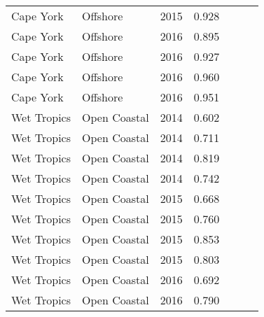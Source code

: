 {\begin{longtable}{llccccc}
  Cape York & Offshore & 2015 & 0.928 & \cellcolor[HTML]{00734D}{A} & \cellcolor[HTML]{00734D}{A} & \cellcolor[HTML]{00734D}{A} \\ 
  Cape York & Offshore & 2016 & 0.895 & \cellcolor[HTML]{00734D}{A} & \cellcolor[HTML]{00734D}{A} & \cellcolor[HTML]{00734D}{A} \\ 
  Cape York & Offshore & 2016 & 0.927 & \cellcolor[HTML]{00734D}{A} & \cellcolor[HTML]{00734D}{A} & \cellcolor[HTML]{00734D}{A} \\ 
  Cape York & Offshore & 2016 & 0.960 & \cellcolor[HTML]{00734D}{A} & \cellcolor[HTML]{00734D}{A} & \cellcolor[HTML]{00734D}{A} \\ 
  Cape York & Offshore & 2016 & 0.951 & \cellcolor[HTML]{00734D}{A} & \cellcolor[HTML]{00734D}{A} & \cellcolor[HTML]{00734D}{A} \\ 
  Wet Tropics & Open Coastal & 2014 & 0.602 & \cellcolor[HTML]{F0C918}{C} & \cellcolor[HTML]{B0D235}{B} & \cellcolor[HTML]{F0C918}{C} \\ 
  Wet Tropics & Open Coastal & 2014 & 0.711 & \cellcolor[HTML]{B0D235}{B} & \cellcolor[HTML]{B0D235}{B} & \cellcolor[HTML]{B0D235}{B} \\ 
  Wet Tropics & Open Coastal & 2014 & 0.819 & \cellcolor[HTML]{B0D235}{B} & \cellcolor[HTML]{00734D}{A} & \cellcolor[HTML]{B0D235}{B} \\ 
  Wet Tropics & Open Coastal & 2014 & 0.742 & \cellcolor[HTML]{B0D235}{B} & \cellcolor[HTML]{B0D235}{B} & \cellcolor[HTML]{B0D235}{B} \\ 
  Wet Tropics & Open Coastal & 2015 & 0.668 & \cellcolor[HTML]{B0D235}{B} & \cellcolor[HTML]{B0D235}{B} & \cellcolor[HTML]{B0D235}{B} \\ 
  Wet Tropics & Open Coastal & 2015 & 0.760 & \cellcolor[HTML]{B0D235}{B} & \cellcolor[HTML]{B0D235}{B} & \cellcolor[HTML]{B0D235}{B} \\ 
  Wet Tropics & Open Coastal & 2015 & 0.853 & \cellcolor[HTML]{00734D}{A} & \cellcolor[HTML]{00734D}{A} & \cellcolor[HTML]{00734D}{A} \\ 
  Wet Tropics & Open Coastal & 2015 & 0.803 & \cellcolor[HTML]{B0D235}{B} & \cellcolor[HTML]{00734D}{A} & \cellcolor[HTML]{B0D235}{B} \\ 
  Wet Tropics & Open Coastal & 2016 & 0.692 & \cellcolor[HTML]{B0D235}{B} & \cellcolor[HTML]{B0D235}{B} & \cellcolor[HTML]{B0D235}{B} \\ 
  Wet Tropics & Open Coastal & 2016 & 0.790 & \cellcolor[HTML]{B0D235}{B} & \cellcolor[HTML]{B0D235}{B} & \cellcolor[HTML]{B0D235}{B} \\ 

\end{longtable}}
